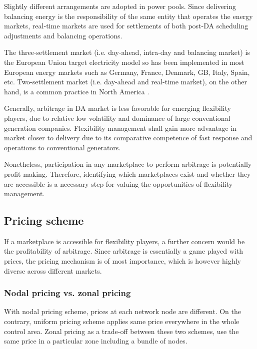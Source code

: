 Slightly different arrangements are adopted in power pools. Since delivering balancing energy is the responsibility of the  same entity that operates the energy markets, real-time markets are used for settlements of both post-DA scheduling adjustments and balancing operations.

The three-settlement market (i.e. day-ahead, intra-day and balancing market) is the European Union target electricity model \cite{EuropeanCommission2016} so has been implemented in most European energy markets such as Germany, France, Denmark, GB, Italy, Spain, etc.  Two-settlement market (i.e. day-ahead and real-time market), on the other hand, is a common practice in North America  \cite{Cochran2013}.

Generally, arbitrage in DA market is less favorable for emerging flexibility players, due to relative low volatility and dominance of large conventional generation companies. Flexibility management shall gain more advantage in market closer to delivery due to its comparative competence of fast response and operations to conventional generators. 

Nonetheless, participation in any marketplace to perform arbitrage is potentially profit-making. Therefore, identifying which marketplaces exist and whether they are accessible is a necessary step for valuing the opportunities of flexibility management.

\subsection{Pricing scheme}
If a marketplace is accessible for flexibility players, a further concern would be the profitability of arbitrage. Since arbitrage is essentially a game played with prices, the pricing mechanism is of most importance, which is however highly diverse across different markets.

\subsubsection{Nodal pricing vs. zonal pricing}
With nodal pricing scheme, prices at each network node are different. On the contrary, uniform pricing scheme applies same price everywhere in the whole control area. Zonal pricing as a trade-off between these two schemes, use the same price in a particular zone including a bundle of nodes.

